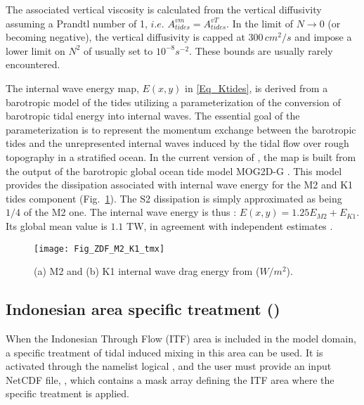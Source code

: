 \documentclass[NEMO_book]{subfiles}
\begin{document}
The associated vertical viscosity is calculated from the vertical 
diffusivity assuming a Prandtl number of 1, $i.e.$ $A^{vm}_{tides}=A^{vT}_{tides}$. 
In the limit of $N \rightarrow 0$ (or becoming negative), the vertical diffusivity 
is capped at $300\,cm^2/s$ and impose a lower limit on $N^2$ of  
usually set to $10^{-8} s^{-2}$. These bounds are usually rarely encountered.

The internal wave energy map, $E(x, y)$ in \eqref{Eq_Ktides}, is derived 
from a barotropic model of the tides utilizing a parameterization of the 
conversion of barotropic tidal energy into internal waves. 
The essential goal of the parameterization is to represent the momentum 
exchange between the barotropic tides and the unrepresented internal waves 
induced by the tidal flow over rough topography in a stratified ocean. 
In the current version of \NEMO, the map is built from the output of 
the barotropic global ocean tide model MOG2D-G \citep{Carrere_Lyard_GRL03}.
This model provides the dissipation associated with internal wave energy for the M2 and K1 
tides component (Fig.~\ref{Fig_ZDF_M2_K1_tmx}). The S2 dissipation is simply approximated
as being $1/4$ of the M2 one. The internal wave energy is thus : $E(x, y) = 1.25 E_{M2} + E_{K1}$. 
Its global mean value is $1.1$ TW, in agreement with independent estimates 
\citep{Egbert_Ray_Nat00, Egbert_Ray_JGR01}. 

\begin{figure}[!t] 	\begin{center}
\texttt{[image: Fig\_ZDF\_M2\_K1\_tmx]}
\caption{  \label{Fig_ZDF_M2_K1_tmx} 
(a) M2 and (b) K1 internal wave drag energy from \citet{Carrere_Lyard_GRL03} ($W/m^2$). }
\end{center}  	\end{figure}
 
\subsection{Indonesian area specific treatment ()}
\label{ZDF_tmx_itf}

When the Indonesian Through Flow (ITF) area is included in the model domain,
a specific treatment of tidal induced mixing in this area can be used. 
It is activated through the namelist logical , and the user must provide
an input NetCDF file, , which contains a mask array defining the ITF area
where the specific treatment is applied.
\end{document}
